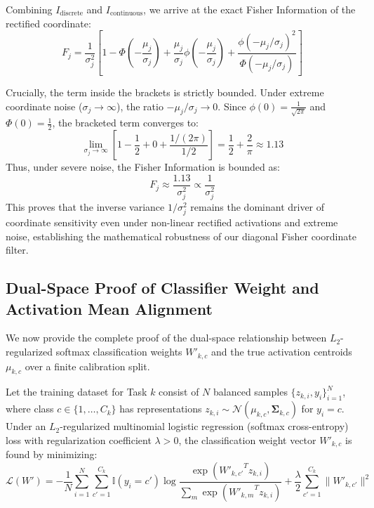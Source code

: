 Combining $I_{\text{discrete}}$ and $I_{\text{continuous}}$, we arrive at the exact Fisher Information of the rectified coordinate:
\begin{equation}
F_{j} = \frac{1}{\sigma_j^2} \left[ 1 - \Phi\left(-\frac{\mu_j}{\sigma_j}\right) + \frac{\mu_j}{\sigma_j} \phi\left(-\frac{\mu_j}{\sigma_j}\right) + \frac{\phi(-\mu_j/\sigma_j)^2}{\Phi(-\mu_j/\sigma_j)} \right]
\end{equation}

Crucially, the term inside the brackets is strictly bounded. Under extreme coordinate noise ($\sigma_j \to \infty$), the ratio $-\mu_j / \sigma_j \to 0$. Since $\phi(0) = \frac{1}{\sqrt{2\pi}}$ and $\Phi(0) = \frac{1}{2}$, the bracketed term converges to:
\begin{equation}
\lim_{\sigma_j \to \infty} \left[ 1 - \frac{1}{2} + 0 + \frac{1/(2\pi)}{1/2} \right] = \frac{1}{2} + \frac{2}{\pi} \approx 1.13
\end{equation}
Thus, under severe noise, the Fisher Information is bounded as:
\begin{equation}
F_j \approx \frac{1.13}{\sigma_j^2} \propto \frac{1}{\sigma_j^2}
\end{equation}
This proves that the inverse variance $1/\sigma_j^2$ remains the dominant driver of coordinate sensitivity even under non-linear rectified activations and extreme noise, establishing the mathematical robustness of our diagonal Fisher coordinate filter.

\subsection{Dual-Space Proof of Classifier Weight and Activation Mean Alignment}
\label{sec:app_proxy_proof}

We now provide the complete proof of the dual-space relationship between $L_2$-regularized softmax classification weights $W'_{k, c}$ and the true activation centroids $\mu_{k, c}$ over a finite calibration split.

Let the training dataset for Task $k$ consist of $N$ balanced samples $\{z_{k, i}, y_i\}_{i=1}^N$, where class $c \in \{1, \dots, C_k\}$ has representations $z_{k, i} \sim \mathcal{N}(\mu_{k, c}, \mathbf{\Sigma}_{k, c})$ for $y_i = c$. Under an $L_2$-regularized multinomial logistic regression (softmax cross-entropy) loss with regularization coefficient $\lambda > 0$, the classification weight vector $W'_{k, c}$ is found by minimizing:
\begin{equation}
\mathcal{L}(W') = -\frac{1}{N}\sum_{i=1}^N \sum_{c'=1}^{C_k} \mathbb{I}(y_i = c') \log \frac{\exp({W'_{k, c'}}^T z_{k, i})}{\sum_{m} \exp({W'_{k, m}}^T z_{k, i})} + \frac{\lambda}{2}\sum_{c'=1}^{C_k} \|W'_{k, c'}\|^2
\end{equation}

